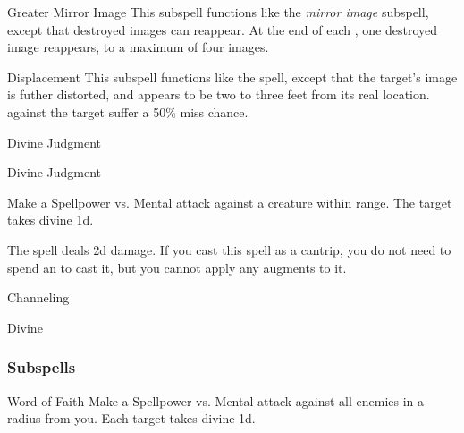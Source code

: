 \begin{ability}[\nth{5}]{Greater Mirror Image}
This subspell functions like the \textit{mirror image} subspell, except that destroyed images can reappear.
At the end of each , one destroyed image reappears, to a maximum of four images.
\end{ability}
\vspace{0.25em}


\begin{ability}[\nth{7}]{Displacement}
This subspell functions like the  spell, except that the target's image is futher distorted, and appears to be two to three feet from its real location.
  against the target suffer a 50\% miss chance.
\end{ability}
\vspace{0.25em}

\newpage
\begin{spellsection}{Divine Judgment}

\begin{spellheader}
\end{spellheader}


\begin{ability}{Divine Judgment}

Make a Spellpower vs. Mental attack against a creature within \rngmed range.
\hit The target takes divine  \plus1d.

\end{ability}



 The spell deals \minus2d damage. If you cast this spell as a cantrip,
you do not need to spend an  to cast it,
but you cannot apply any augments to it.


 Channeling

 Divine
\end{spellsection}


\subsubsection{Subspells}


\begin{ability}[\nth{2}]{Word of Faith}
Make a Spellpower vs. Mental attack against all enemies in a \areamed radius from you.
\hit Each target takes divine  \minus1d.
\end{ability}
\vspace{0.25em}

